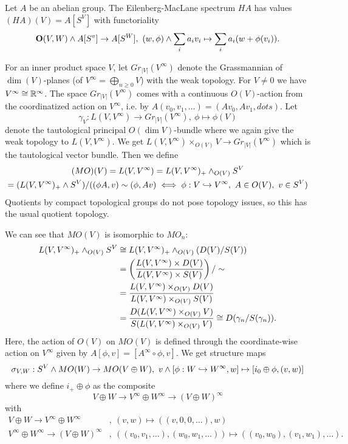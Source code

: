Let $A$ be an abelian group. The Eilenberg-MacLane spectrum $HA$ has values $(HA)(V)=A[S^V]$ with functoriality
\[\Or(V,W)\smsh A[S^v]\to A[S^W],\ (w,\phi)\smsh\sum_i a_iv_i\mapsto\sum_i a_i(w+\phi(v_i)).\]

For an inner product space $V$, let $Gr_{|V|}(V^\infty)$ denote the Grassmannian of $\dim(V)$-planes (of $V^\infty=\bigoplus_{n\geq0}V$) with the weak topology. For $V\neq0$ we have $V^\infty\cong{\mathbb R}^\infty$. The space $Gr_{|V|}(V^\infty)$ comes with a continuous $O(V)$-action from the coordinatized action on $V^\infty$, i.e. by $A(v_0,v_1,\dots)=(Av_0,Av_1,dots)$. Let
\[\gamma_V:L(V,V^\infty)\to Gr_{|V|}(V^\infty),\ \phi\mapsto\phi(V)\]
denote the tautological principal $O(\dim V)$-bundle where we again give the weak topology to $L(V,V^\infty)$. We get $L(V,V^\infty)\times_{O(V)}V\to Gr_{|V|}(V^\infty)$ which is the tautological vector bundle. Then we define
\begin{multline*}
    (MO)(V)=L(V,V^\infty)=L(V,V^\infty)_+\smsh_{O(V)}S^V\\
    =(L(V,V^\infty)_+\smsh S^V)/((\phi A,v)\sim(\phi, Av)\iff\phi:V\into V^\infty,\ A\in O(V),\ v\in S^V)
\end{multline*}
Quotients by compact topological groups do not pose topology issues, so this has the usual quotient topology.

We can see that $MO(V)$ is isomorphic to $MO_n$:
\begin{align*}
    L(V,V^\infty)_+\wedge_{O(V)}S^V&\cong L(V,V^\infty)_+\wedge_{O(V)}(D(V)/S(V))\\
    &=\left(\frac{L(V,V^\infty)\times D(V)}{L(V,V^\infty)\times S(V)}\right)/\sim\\
    &=\frac{L(V,V^\infty)\times_{O(V)}D(V)}{L(V,V^\infty)\times_{O(V)}S(V)}\\
    &=\frac{D(L(V,V^\infty)\times_{O(V)}V)}{S(L(V,V^\infty)\times_{O(V)}V)}\cong D(\gamma_n/S(\gamma_n)).
\end{align*}
Here, the action of $O(V)$ on $MO(V)$ is defined through the coordinate-wise action on $V^\infty$ given by $A[\phi,v]=[A^\infty\circ\phi,v]$. We get structure maps
\[\sigma_{V,W}:S^V\smsh MO(W)\to MO(V\oplus W),\ v\smsh[\phi:W\into W^\infty,w]\mapsto[i_0\oplus\phi,(v,w)]\]
where we define $i_+\oplus\phi$ as the composite
\[V\oplus W\to V^\infty\oplus W^\infty\to(V\oplus W)^\infty\]
with
\begin{align*}
V\oplus W\to V^\infty\oplus W^\infty&,\ (v,w)\mapsto((v,0,0,\dots),w)\\
V^\infty\oplus W^\infty\to(V\oplus W)^\infty&,\ ((v_0,v_1,\dots),(w_0,w_1,\dots))\mapsto((v_0,w_0),(v_1,w_1),\dots).
\end{align*}


